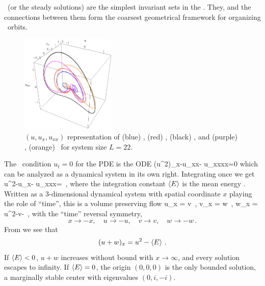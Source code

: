 \Eqva\  (or the steady solutions)
are the simplest invariant sets in
the \statesp. They,  and 
the connections between them form the
coarsest geometrical framework for organizing
\statesp\ orbits. %

\begin{figure}[t] \label{f:eqvSpatial}
\begin{center} 
\includegraphics[width=0.4\textwidth]{figs/equilSpatial.eps}
\end{center}
\caption{
$(u,u_x,u_{xx})$ representation
of (blue) , (red) ,  (black)  \eqva,
 and (purple) , (orange)  \reqva\ for
system size $L=22$. %
        }
\end{figure}

The \eqv\ condition $u_t=0$ for the {\KSe} PDE  
is the ODE
\beq
(u^2)_x-u_{xx}- u_{xxxx}=0 
which can be analyzed as a dynamical system in its own right.
Integrating once we get
\beq
u^2-u_x- u_{xxx}=
\,,
\label{eq:stdks}
\eeq
where the integration constant
$\left\langle {E} \right\rangle$
is the mean energy .
Written as a 3-dimensional dynamical system
with spatial coordinate $x$ playing the role of ``time'',
this is a volume preserving flow
\beq
u_x = v \,,\qquad
v_x = w \,,\qquad
w_x = u^2-v- \,,
  \label{eq:3dks}
\eeq
with the ``time'' reversal symmetry, 
\[
x \to -x,\quad u \to -u, \quad v \to v, \quad w \to -w \,.
\]
 From  we see that
\[
(u+w)_x=u^2-\left\langle {E} \right\rangle \,.
\]
If $\left\langle {E} \right\rangle<0$, $u+w$ increases without bound with $x \to \infty$,
and every solution escapes to infinity.
If $\left\langle {E} \right\rangle=0$, the origin $(0,0,0)$ is the
only bounded  solution, a marginally stable center with
eigenvalues $(0, i,-i)$.

